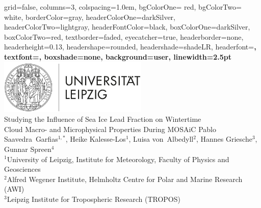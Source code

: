 \documentclass[portrate,a0paper,fontscale=0.45,margin=1cm]{baposter}
\begin{document}
\begin{poster}%
  {
  grid=false, %
  columns=3,
  colspacing=1.0em,
  bgColorOne= red, %
  bgColorTwo= white, %
  borderColor=gray, %
  headerColorOne=darkSilver, %
  headerColorTwo=lightgray, 
  headerFontColor=black, %
  boxColorOne=darkSilver, %
  boxColorTwo=red, %
  textborder=faded,
  eyecatcher=true,
  headerborder=none, %
  headerheight=0.13\textheight,
  headershape=rounded, %
  headershade=shadeLR,
  headerfont=\LARGE\bf,  %
  textfont={\color{black}\setlength{\parindent}{1.5em}},
  boxshade=none, %
  background=user, %
  linewidth=2.5pt
  }
  {
      \includegraphics[height=7.0em]{uni_leipzig-logo.jpg}\\
  }
  {
  	Studying the Influence of Sea Ice Lead Fraction on Wintertime\\Cloud Macro- and Microphysical Properties During MOSAiC
  }
  {\vspace{+1em} \color{black}Pablo Saavedra~Garfias$^{1,*}$, Heike Kalesse-Los$^{1}$, Luisa von~Albedyll$^{2}$, Hannes Griesche$^{3}$, Gunnar Spreen$^{4}$\\
    $^1$University of Leipzig, Institute for Meteorology, Faculty of Physics and Geosciences\\
    $^2$Alfred Wegener Institute, Helmholtz Centre for Polar and Marine Research (AWI)\\
    $^3$Leipzig Institute for Tropospheric Research (TROPOS)\\
}
\end{poster}
\end{document}

